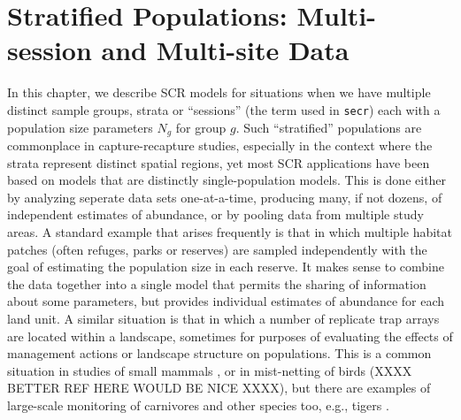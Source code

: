 \chapter{Stratified Populations:
Multi-session and Multi-site Data}
\label{chapt.hscr}

\vspace{0.3cm}


In this chapter, we describe SCR models for situations when we have
multiple distinct sample groups, strata or ``sessions'' (the term used
in \mbox{\tt secr}) each with a population size parameters $N_{g}$ for
group $g$.
Such ``stratified'' populations are commonplace in capture-recapture
studies, especially in the context where the strata represent
distinct spatial regions, yet most SCR applications have been based
 on models that are distinctly single-population models. This is done
 either by analyzing seperate data sets one-at-a-time, producing many,
 if not dozens, of independent estimates of abundance, or by pooling
 data from multiple study areas.  A standard example that arises
frequently is that in which multiple habitat patches (often refuges,
parks or reserves) are sampled independently with the goal of
estimating the population size in each reserve. It makes sense to
combine the data together into a single model that permits the
sharing of information about some parameters, but provides individual
estimates of abundance for each land unit.  A similar situation is
that in which a number of replicate trap arrays are located within a
landscape, sometimes for purposes of evaluating the effects of
management actions or landscape structure on populations. This is a
common situation in studies of small mammals
 \citep{converse_etal:2006jwm, converse_etal:2006ea,
   converse_royle:2012}, or in mist-netting of birds
 \citep{desante_etal:1995} (XXXX BETTER REF HERE WOULD BE NICE XXXX),
but there are examples of large-scale monitoring of carnivores and
other species too, e.g., tigers \citep{jhala_etal:2011}.


